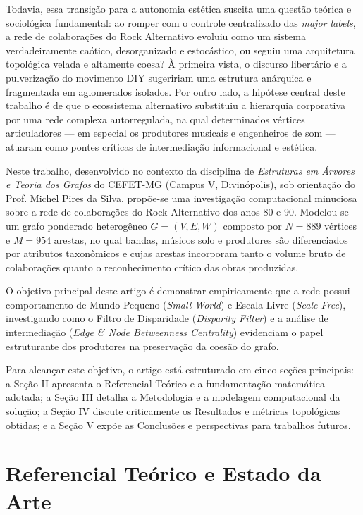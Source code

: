 \documentclass[conference]{IEEEtran}
\begin{document}
Todavia, essa transição para a autonomia estética suscita uma questão teórica e sociológica fundamental: ao romper com o controle centralizado das \textit{major labels}, a rede de colaborações do Rock Alternativo evoluiu como um sistema verdadeiramente caótico, desorganizado e estocástico, ou seguiu uma arquitetura topológica velada e altamente coesa? À primeira vista, o discurso libertário e a pulverização do movimento DIY sugeririam uma estrutura anárquica e fragmentada em aglomerados isolados. Por outro lado, a hipótese central deste trabalho é de que o ecossistema alternativo substituiu a hierarquia corporativa por uma rede complexa autorregulada, na qual determinados vértices articuladores --- em especial os produtores musicais e engenheiros de som --- atuaram como pontes críticas de intermediação informacional e estética.

Neste trabalho, desenvolvido no contexto da disciplina de \textit{Estruturas em Árvores e Teoria dos Grafos} do CEFET-MG (Campus V, Divinópolis), sob orientação do Prof. Michel Pires da Silva, propõe-se uma investigação computacional minuciosa sobre a rede de colaborações do Rock Alternativo dos anos 80 e 90. Modelou-se um grafo ponderado heterogêneo $G=(V, E, W)$ composto por $N=889$ vértices e $M=954$ arestas, no qual bandas, músicos solo e produtores são diferenciados por atributos taxonômicos e cujas arestas incorporam tanto o volume bruto de colaborações quanto o reconhecimento crítico das obras produzidas.

O objetivo principal deste artigo é demonstrar empiricamente que a rede possui comportamento de Mundo Pequeno (\textit{Small-World}) e Escala Livre (\textit{Scale-Free}), investigando como o Filtro de Disparidade (\textit{Disparity Filter}) e a análise de intermediação (\textit{Edge \& Node Betweenness Centrality}) evidenciam o papel estruturante dos produtores na preservação da coesão do grafo.

Para alcançar este objetivo, o artigo está estruturado em cinco seções principais: a Seção II apresenta o Referencial Teórico e a fundamentação matemática adotada; a Seção III detalha a Metodologia e a modelagem computacional da solução; a Seção IV discute criticamente os Resultados e métricas topológicas obtidas; e a Seção V expõe as Conclusões e perspectivas para trabalhos futuros.

\section{Referencial Teórico e Estado da Arte}
\end{document}
